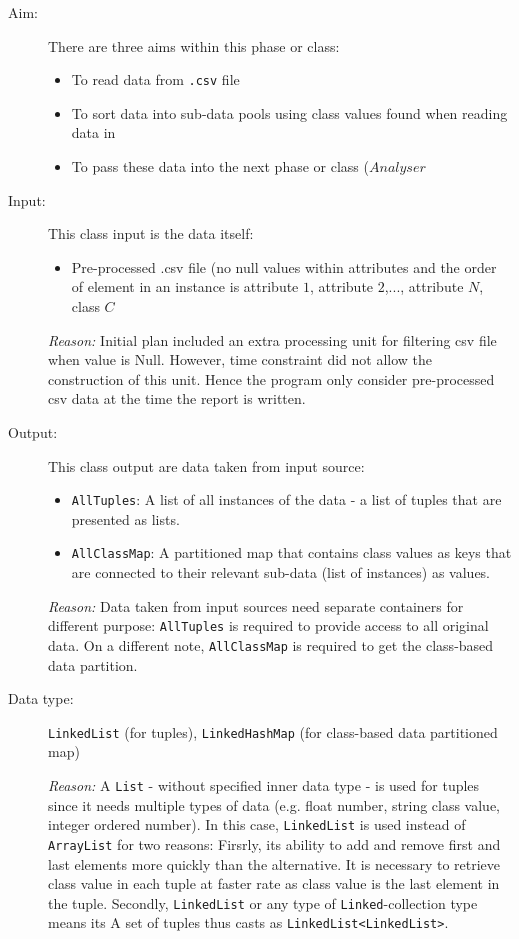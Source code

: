 \begin{description}

\item[Aim: ] There are three aims within this phase or class:
\begin{itemize}
	\item{To read data from \texttt{.csv} file} 
	\item{To sort data into sub-data pools using class values found when reading data in} 
	\item{To pass these data into the next phase or class ($Analyser$} 
\end{itemize}

\item[Input: ] This class input is the data itself:
\begin{itemize}
	\item{Pre-processed .csv file (no null values within attributes and the order of element in an instance is {attribute $1$, attribute $2$,..., attribute $N$, class $C$}}
\end{itemize} 

\textit{Reason: } Initial plan included an extra processing unit for filtering csv file when value is Null. However, time constraint did not allow the construction of this unit. Hence the program only consider pre-processed csv data at the time the report is written.

\item[Output: ] This class output are data taken from input source:
\begin{itemize}
	\item{\texttt{AllTuples}: A list of all instances of the data - a list of tuples that are presented as lists.}
	\item{\texttt{AllClassMap}: A partitioned map that contains class values as keys that are connected to their relevant sub-data (list of instances) as values.}
\end{itemize}
  
\textit{Reason: } Data taken from input sources need separate containers for different purpose: \texttt{AllTuples} is required to provide access to all original data. On a different note, \texttt{AllClassMap} is required to get the class-based data partition.

\item[Data type: ] \texttt{LinkedList} (for tuples), \texttt{LinkedHashMap} (for class-based data partitioned map)

\textit{Reason: } A \texttt{List} - without specified inner data type - is used for tuples since it needs multiple types of data (e.g. float number, string class value, integer ordered number). In this case, \texttt{LinkedList} is used instead of \texttt{ArrayList} for two reasons: Firsrly, its ability to add and remove first and last elements more quickly than the alternative. It is necessary to retrieve class value in each tuple at faster rate as class value is the last element in the tuple. Secondly, \texttt{LinkedList} or any type of \texttt{Linked}-collection type means its  A set of tuples thus casts as \texttt{LinkedList<LinkedList>}.


\end{description}
